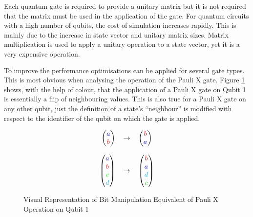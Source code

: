 Each quantum gate is required to provide a unitary matrix but it is not required that the matrix must be used in the application of the gate.
For quantum circuits with a high number of qubits, the cost of simulation increases rapidly.
This is mainly due to the increase in state vector and unitary matrix sizes.
Matrix multiplication is used to apply a unitary operation to a state vector, yet it is a very expensive operation.

To improve the performance optimisations can be applied for several gate types.
This is most obvious when analysing the operation of the Pauli X gate.
Figure \ref{eq:paulixcheaptrickvisual} shows, with the help of colour, that the application of a Pauli X gate on Qubit 1 is essentially a flip of neighbouring values.
This is also true for a Pauli X gate on any other qubit, just the definition of a state's ``neighbour'' is modified with respect to the identifier of the qubit on which the gate is applied.

\begin{figure}
\[
\begin{tabular}{ r c l }
  \(\begin {pmatrix}
    \textcolor{blue}{a}\\
    \textcolor{red}{b}
  \end{pmatrix}\) 
& 
  \(\rightarrow\) 
& 
  \(\begin {pmatrix}
    \textcolor{red}{b}\\
    \textcolor{blue}{a}
  \end{pmatrix}\) \\

\\

  \(\begin {pmatrix}
    \textcolor{blue}{a}\\
    \textcolor{red}{b}\\
    \textcolor{green}{c}\\
    \textcolor{cyan}{d}
  \end{pmatrix}\)
  & \(\rightarrow\)
  & \(\begin {pmatrix}
    \textcolor{red}{b}\\
    \textcolor{blue}{a}\\
    \textcolor{cyan}{d}\\
    \textcolor{green}{c}
  \end{pmatrix}\) \\
\end{tabular}
\]
\label{eq:paulixcheaptrickvisual}
\caption{Visual Representation of Bit Manipulation Equivalent of Pauli X Operation on Qubit 1}
\end{figure}

